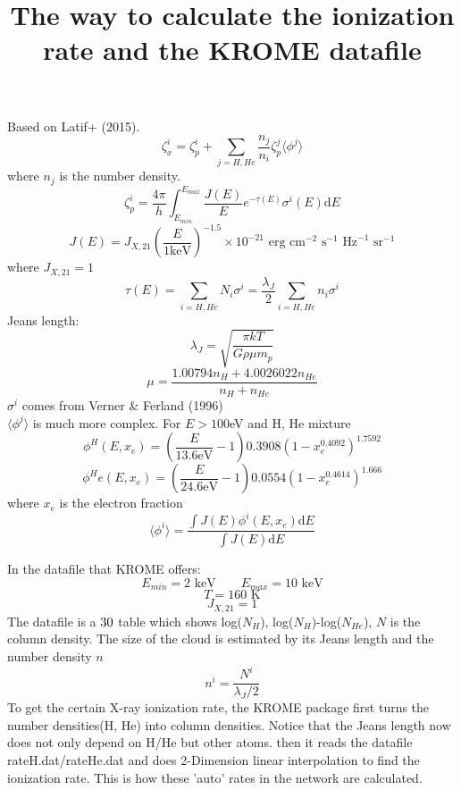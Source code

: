 \documentclass[UTF8]{article}
\begin{document}
	
	\pagestyle{plain}
	\title{\textbf{The way to calculate the ionization rate and the KROME datafile}}
	\author{}
	\date{}
	\maketitle
	\renewcommand\arraystretch{1.3}
	Based on Latif+ (2015).\\
	$$\zeta_x^i=\zeta_p^i+\sum_{j=H,He}\frac{n_j}{n_i}\zeta_p^j\langle\phi^j\rangle$$
	where $n_j$ is the number density.
	$$\zeta_p^i=\frac{4\pi}{h}\int_{E_{min}}^{E_{max}}\frac{J(E)}{E}e^{-\tau(E)}\sigma^i(E)\text{d}E$$
	$$J(E)=J_{X,21}\left( \frac{E}{1\text{keV}}\right) ^{-1.5}\times10^{-21}\text{ erg cm}^{−2}\text{ s}^{-1}\text{ Hz}^{-1} \text{ sr}^{-1}$$
	where $J_{X,21}=1$
	$$\tau(E)=\sum_{i=H,He}N_i\sigma^i=\frac{\lambda_J}{2}\sum_{i=H,He}n_i\sigma^i$$
	Jeans length:
	$$\lambda_J=\sqrt{\frac{\pi kT}{G\rho \mu m_p}}$$
	$$\mu=\frac{1.00794n_H+4.0026022n_{He}}{n_H+n_{He}}$$
	$\sigma^i$ comes from Verner $\&$ Ferland (1996)\\
	$\langle\phi^j\rangle$ is much more complex. For $E>100$eV and H, He mixture
	$$\phi^H(E,x_e)=\left( \frac{E}{13.6\text{eV}}-1\right)0.3908(1-x_e^{0.4092})^{1.7592} $$
	$$\phi^He(E,x_e)=\left( \frac{E}{24.6\text{eV}}-1\right)0.0554(1-x_e^{0.4614})^{1.666} $$
	where $x_e$ is the electron fraction
	$$\langle\phi^i\rangle=\frac{\int J(E)\phi^i(E,x_e)\text{d}E}{\int J(E)\text{d}E}$$
	
	\noindent In the datafile that KROME offers:
	$$E_{min}=2\text{ keV}\qquad E_{max}=10\text{ keV}$$
	$$T=160\text{ K}$$
	$$J_{X,21}=1$$
	The datafile is a $30\time30$ table which shows log($N_H$), log($N_{H}$)-log($N_{He}$), $N$ is the column density. The size of the cloud is estimated by its Jeans length and the number density $n$
	$$n^i=\frac{N^i}{\lambda_J/2}$$
	To get the certain X-ray ionization rate, the KROME package first turns the number densities(H, He) into column densities. Notice that the Jeans length now does not only depend on H/He but other atoms. then it reads the datafile rateH.dat/rateHe.dat and does 2-Dimension linear interpolation to find the ionization rate. This is how these 'auto' rates in the network are calculated.
	
\end{document}
